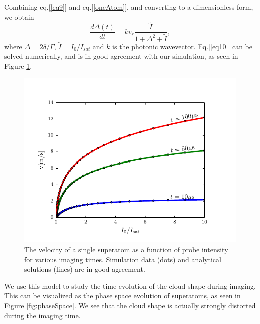 \documentclass[12pt]{iopart}
\begin{document}
Combining eq.[\ref{eq9}] and eq.[\ref{oneAtom}], and converting to a dimensionless form, we obtain
\begin{equation}
\frac{d\Delta(t)}{dt}= k v_r \frac{\tilde{I}}{1+\Delta^2+\tilde{I}},
\label{eq10}
\end{equation}
where $\Delta = 2\delta/\Gamma$, $\tilde{I} = I_0/I_{sat}$ and $k$ is the photonic wavevector. Eq.[\ref{eq10}] can be solved numerically, and is in good agreement with our simulation, as seen in Figure \ref{fig:oneAtomVel}.
\begin{figure}
	\includegraphics{figure5.pdf}
\caption{The velocity of a single superatom as a function of probe intensity for various imaging times. Simulation data (dots) and analytical solutions (lines) are in good agreement.}  
\label{fig:oneAtomVel}
\end{figure}
\par We use this model to study the time evolution of the cloud shape during imaging. This can be visualized as the phase space evolution of superatoms, as seen in Figure \ref{fig:phaseSpace}. We see that the cloud shape is actually strongly distorted during the imaging time. 
\end{document}
